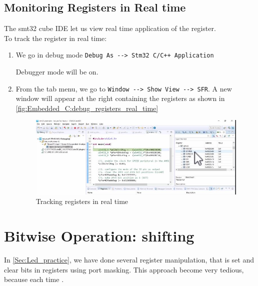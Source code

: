 \newpage
\subsection{Monitoring Registers in Real time}
\label{Sub:Registers_real_time_debug}

The smt32 cube IDE let us view real time application of the register.\\

To track the register in real time:

\begin{enumerate}
    \item We go in debug mode \verb|Debug As --> Stm32 C/C++ Application|
    
    Debugger mode will be on.
    
    \item From the tab menu, we go to \verb|Window --> Show View --> SFR|. A new window will appear at the right containing the registers as shown in \autoref{fig:Embedded_C:debug_registers_real_time}
    
    \begin{figure}[h]
\centering
\includegraphics[scale=0.7]{Figures/Embedded_C/debug_registers_real_time}
\caption{Tracking registers in real time}
\label{fig:Embedded_C:debug_registers_real_time}
\end{figure}
    
    
\end{enumerate}





\newpage
\section{Bitwise Operation: shifting}

In \autoref{Sec:Led_practice}, we have done several register manipulation, that is set and clear bits in registers using port masking. This approach become very tedious, because each time .

